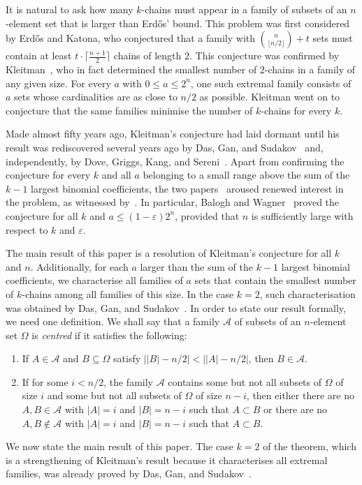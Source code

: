 \documentclass[11pt,a4paper,reqno]{amsart}
\numberwithin{claim}{thm}
\theoremstyle{definition}
\newcommand{\cA}{\mathcal{A}}
\renewcommand{\le}{\leqslant}
\begin{document}
It is natural to ask how many $k$-chains must appear in a family of subsets of an $n$-element set that is larger than Erd\H{o}s' bound. This problem was first considered by Erd\H{o}s and Katona, who conjectured that a family with $\binom{n}{\lfloor n/2 \rfloor} + t$ sets must contain at least $t \cdot \lceil \frac{n+1}{2} \rceil$ chains of length $2$. This conjecture was confirmed by Kleitman~\cite{Kl68}, who in fact determined the smallest number of $2$-chains in a family of any given size. For every $a$ with $0 \le a \le 2^n$, one such extremal family consists of $a$ sets whose cardinalities are as close to $n/2$ as possible. Kleitman went on to conjecture that the same families minimise the number of $k$-chains for every $k$.

Made almost fifty years ago, Kleitman's conjecture had laid dormant until his result was rediscovered several years ago by Das, Gan, and Sudakov~\cite{DaGaSu15} and, independently, by Dove, Griggs, Kang, and Sereni~\cite{DoGrKaSe14}. Apart from confirming the conjecture for every $k$ and all $a$ belonging to a small range above the sum of the $k-1$ largest binomial coefficients, the two papers~\cite{DaGaSu15, DoGrKaSe14} aroused renewed interest in the problem, as witnessed by~\cite{BaPeWa, BaWa, NoScSu}. In particular, Balogh and Wagner~\cite{BaWa} proved the conjecture for all $k$ and $a \le (1-\varepsilon)2^n$, provided that $n$ is sufficiently large with respect to $k$ and $\varepsilon$.

The main result of this paper is a resolution of Kleitman's conjecture for all $k$ and $n$. Additionally, for each $a$ larger than the sum of the $k-1$ largest binomial coefficients, we characterise all families of $a$ sets that contain the smallest number of $k$-chains among all families of this size. In the case $k = 2$, such characterisation was obtained by Das, Gan, and Sudakov~\cite{DaGaSu15}. In order to state our result formally, we need one definition. We shall say that a family $\cA$ of subsets of an $n$-element set $\Omega$ is \emph{centred} if it satisfies the following:
\begin{enumerate}[label={(\roman*)}]
\item
  \label{item:centred-1}
  If $A \in \cA$ and $B \subseteq \Omega$ satisfy $\big| |B| - n/2 \big| < \big| |A| - n/2 \big|$, then $B \in \cA$.
\item
  \label{item:centred-2}
  If for some $i < n/2$, the family $\cA$ contains some but not all subsets of $\Omega$ of size $i$ and some but not all subsets of $\Omega$ of size $n-i$, then either there are no $A, B \in \cA$ with $|A| = i$ and $|B| = n-i$ such that $A \subset B$ or there are no $A, B \not\in \cA$ with $|A| = i$ and $|B| = n-i$ such that $A \subset B$.
\end{enumerate}
We now state the main result of this paper. The case $k=2$ of the theorem, which is a strengthening of Kleitman's result because it characterises all extremal families, was already proved by Das, Gan, and Sudakov~\cite{DaGaSu15}.
\end{document}
